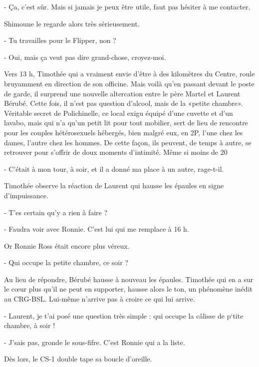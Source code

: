 - Ça, c’est sûr. Mais si jamais je peux être utile, faut pas hésiter à me contacter.

Shimoune le regarde alors très sérieusement.

- Tu travailles pour le Flipper, non ?

- Oui, mais ça veut pas dire grand-chose, croyez-moi.

Vers 13 h, Timothée qui a vraiment envie d’être à des kilomètres du Centre, roule bruyamment en direction de son officine. Mais voilà qu’en passant devant le poste de garde, il surprend une nouvelle altercation entre le père Martel et Laurent Bérubé. Cette fois, il n’est pas question d’alcool, mais de la «petite chambre». Véritable secret de Polichinelle, ce local exigu équipé d’une cuvette et d’un lavabo, mais qui n’a qu’un petit lit pour tout mobilier, sert de lieu de rencontre pour les couples hétérosexuels hébergés, bien malgré eux, en 2P, l’une chez les dames, l’autre chez les hommes. De cette façon, ils peuvent, de temps à autre, se retrouver pour s’offrir de doux moments d’intimité. Même si moins de 20 %

- C’était à mon tour, à soir, et il a donné ma place à un autre, rage-t-il.

Timothée observe la réaction de Laurent qui hausse les épaules en signe d’impuissance.

- T’es certain qu’y a rien à faire ?

- Faudra voir avec Ronnie. C’est lui qui me remplace à 16 h.

Or Ronnie Ross était encore plus véreux.

- Qui occupe la petite chambre, ce soir ?

Au lieu de répondre, Bérubé hausse à nouveau les épaules. Timothée qui en a sur le cœur plus qu’il ne peut en supporter, hausse alors le ton, un phénomène inédit au CRG-BSL. Lui-même n’arrive pas à croire ce qui lui arrive.

- Laurent, je t’ai posé une question très simple : qui occupe la câlisse de p‘tite chambre, à soir !

- J’sais pas, gronde le sous-fifre. C’est Ronnie qui a la liste.

Dès lors, le CS-1 double tape sa boucle d’oreille.

